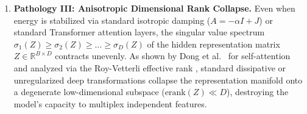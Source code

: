 \documentclass[11pt,a4paper]{article}
\begin{document}
\begin{enumerate}
    \item \textbf{Pathology III: Anisotropic Dimensional Rank Collapse.}
    Even when energy is stabilized via standard isotropic damping ($A = -\alpha I + J$) or standard Transformer attention layers, the singular value spectrum $\sigma_1(Z) \ge \sigma_2(Z) \ge \dots \ge \sigma_D(Z)$ of the hidden representation matrix $Z \in \mathbb{R}^{B\times D}$ contracts unevenly. As shown by Dong et al.\ \cite{dong2021attention} for self-attention and analyzed via the Roy-Vetterli effective rank \cite{roy2007effective,garrido2023rankme,jing2022understanding}, standard dissipative or unregularized deep transformations collapse the representation manifold onto a degenerate low-dimensional subspace ($\mathrm{erank}(Z) \ll D$), destroying the model's capacity to multiplex independent features.
\end{enumerate}
\end{document}
